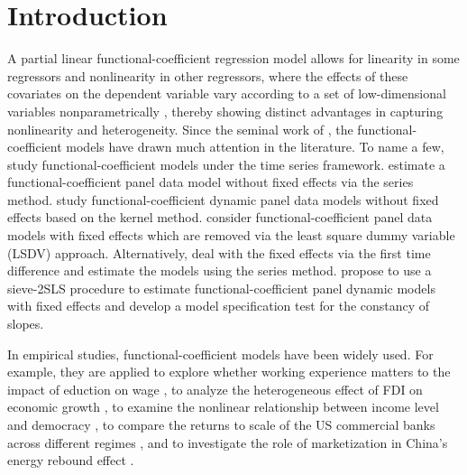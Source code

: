 
\section{Introduction}
A partial linear functional-coefficient regression model allows for linearity in some regressors and nonlinearity in other regressors, where the effects of these covariates on the dependent variable vary according to a set of low-dimensional variables nonparametrically \citep{Cai2017}, thereby showing distinct advantages in capturing nonlinearity and heterogeneity. Since the seminal work of \citet{chen1993functional}, the functional-coefficient models have drawn much attention in the literature. To name a few,
 \citeauthor{cai2000functional} \citeyearpar{cai2000functional,Cai2000JA,cai2009functional} study functional-coefficient models under the time series framework.
 \citet{huang2004polynomial} estimate a functional-coefficient panel data model without fixed effects via the series method. \citet{cai2008nonparametric} study functional-coefficient dynamic panel data models without fixed effects based on the kernel method. \citet{sun2009semiparametric} consider functional-coefficient panel data models with fixed effects which are removed via the least square dummy variable (LSDV) approach. Alternatively, \citet{yonghong2016semiparametric} deal with the fixed effects via the first time difference and estimate the models using the series method. \citet{Zhang2018} propose to use a sieve-2SLS procedure to estimate functional-coefficient panel dynamic models with fixed effects and develop a model specification test for the constancy of slopes.

In empirical studies, functional-coefficient models have been widely used. For example, they are applied to explore whether working experience matters to the impact of eduction on wage \citep{su2013local,Cai2017}, to analyze the heterogeneous effect of FDI on economic growth \citep{Delgado2014,Cai2017}, to examine the nonlinear relationship between income level and democracy \citep{lundberg2017income,Zhang2018}, to compare the returns to scale of the US commercial banks across different regimes \citep{FENG201768}, and to investigate the role of marketization in China's energy rebound effect \citep{LI2019101304}. 

